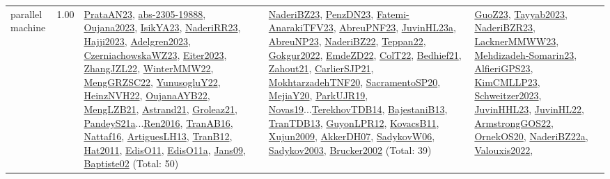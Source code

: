 {\begin{longtable}{p{3cm}r>{\raggedright\arraybackslash}p{6cm}>{\raggedright\arraybackslash}p{6cm}>{\raggedright\arraybackslash}p{8cm}}
\index{parallel machine}\index{Classification!parallel machine}parallel machine &  1.00 & \hyperref[detail:PrataAN23]{PrataAN23}, \hyperref[detail:abs-2305-19888]{abs-2305-19888}, \hyperref[detail:Oujana2023]{Oujana2023}, \hyperref[detail:IsikYA23]{IsikYA23}, \hyperref[detail:NaderiRR23]{NaderiRR23}, \hyperref[detail:Hajji2023]{Hajji2023}, \hyperref[detail:Adelgren2023]{Adelgren2023}, \hyperref[detail:CzerniachowskaWZ23]{CzerniachowskaWZ23}, \hyperref[detail:Eiter2023]{Eiter2023}, \hyperref[detail:ZhangJZL22]{ZhangJZL22}, \hyperref[detail:WinterMMW22]{WinterMMW22}, \hyperref[detail:MengGRZSC22]{MengGRZSC22}, \hyperref[detail:YunusogluY22]{YunusogluY22}, \hyperref[detail:HeinzNVH22]{HeinzNVH22}, \hyperref[detail:OujanaAYB22]{OujanaAYB22}, \hyperref[detail:MengLZB21]{MengLZB21}, \hyperref[detail:Astrand21]{Astrand21}, \hyperref[detail:Groleaz21]{Groleaz21}, \hyperref[detail:PandeyS21a]{PandeyS21a}...\hyperref[detail:Ren2016]{Ren2016}, \hyperref[detail:TranAB16]{TranAB16}, \hyperref[detail:Nattaf16]{Nattaf16}, \hyperref[detail:ArtiguesLH13]{ArtiguesLH13}, \hyperref[detail:TranB12]{TranB12}, \hyperref[detail:Hat2011]{Hat2011}, \hyperref[detail:EdisO11]{EdisO11}, \hyperref[detail:EdisO11a]{EdisO11a}, \hyperref[detail:Jans09]{Jans09}, \hyperref[detail:Baptiste02]{Baptiste02} (Total: 50) & \hyperref[detail:NaderiBZ23]{NaderiBZ23}, \hyperref[detail:PenzDN23]{PenzDN23}, \hyperref[detail:Fatemi-AnarakiTFV23]{Fatemi-AnarakiTFV23}, \hyperref[detail:AbreuPNF23]{AbreuPNF23}, \hyperref[detail:JuvinHL23a]{JuvinHL23a}, \hyperref[detail:AbreuNP23]{AbreuNP23}, \hyperref[detail:NaderiBZ22]{NaderiBZ22}, \hyperref[detail:Teppan22]{Teppan22}, \hyperref[detail:Gokgur2022]{Gokgur2022}, \hyperref[detail:EmdeZD22]{EmdeZD22}, \hyperref[detail:ColT22]{ColT22}, \hyperref[detail:Bedhief21]{Bedhief21}, \hyperref[detail:Zahout21]{Zahout21}, \hyperref[detail:CarlierSJP21]{CarlierSJP21}, \hyperref[detail:MokhtarzadehTNF20]{MokhtarzadehTNF20}, \hyperref[detail:SacramentoSP20]{SacramentoSP20}, \hyperref[detail:MejiaY20]{MejiaY20}, \hyperref[detail:ParkUJR19]{ParkUJR19}, \hyperref[detail:Novas19]{Novas19}...\hyperref[detail:TerekhovTDB14]{TerekhovTDB14}, \hyperref[detail:BajestaniB13]{BajestaniB13}, \hyperref[detail:TranTDB13]{TranTDB13}, \hyperref[detail:GuyonLPR12]{GuyonLPR12}, \hyperref[detail:KovacsB11]{KovacsB11}, \hyperref[detail:Xujun2009]{Xujun2009}, \hyperref[detail:AkkerDH07]{AkkerDH07}, \hyperref[detail:SadykovW06]{SadykovW06}, \hyperref[detail:Sadykov2003]{Sadykov2003}, \hyperref[detail:Brucker2002]{Brucker2002} (Total: 39) & \hyperref[detail:GuoZ23]{GuoZ23}, \hyperref[detail:Tayyab2023]{Tayyab2023}, \hyperref[detail:NaderiBZR23]{NaderiBZR23}, \hyperref[detail:LacknerMMWW23]{LacknerMMWW23}, \hyperref[detail:Mehdizadeh-Somarin23]{Mehdizadeh-Somarin23}, \hyperref[detail:AlfieriGPS23]{AlfieriGPS23}, \hyperref[detail:KimCMLLP23]{KimCMLLP23}, \hyperref[detail:Schweitzer2023]{Schweitzer2023}, \hyperref[detail:JuvinHHL23]{JuvinHHL23}, \hyperref[detail:JuvinHL22]{JuvinHL22}, \hyperref[detail:ArmstrongGOS22]{ArmstrongGOS22}, \hyperref[detail:OrnekOS20]{OrnekOS20}, \hyperref[detail:NaderiBZ22a]{NaderiBZ22a}, \hyperref[detail:Valouxis2022]{Valouxis2022}, 
\end{longtable}}
